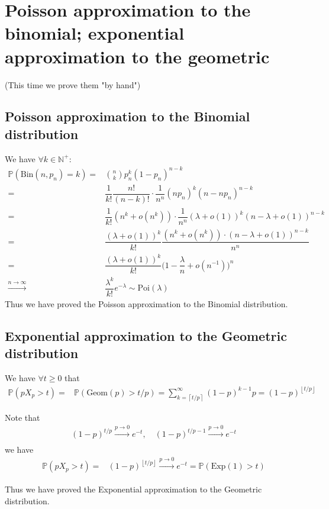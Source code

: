 \documentclass[11pt,a4paper]{article}
\numberwithin{equation}{section}%
\begin{document}
    

\section{Poisson approximation to the binomial; exponential approximation to the geometric}
(This time we prove them "by hand")

\subsection{Poisson approximation to the Binomial distribution}

We have $ \forall k\in \mathbb{N}^+: $
\begin{align*}
    \mathbb{P}\left( \mathrm{ Bin }(n,p_n) = k \right) =&  \binom{n}{k} p_n^k (1-p_n)^{n-k} \\
    =&  \dfrac{ 1 }{ k! }\dfrac{ n! }{ (n-k)! }\cdot \dfrac{ 1 }{ n^n } (np_n)^k (n-np_n)^{n-k} \\
    =& \dfrac{ 1 }{ k! }(n^k + o(n^k))\cdot \dfrac{ 1 }{ n^n } (\lambda +o(1))^k (n-\lambda +o(1))^{n-k} \\
    =& \dfrac{ (\lambda +o(1))^k }{ k! }\dfrac{ (n^k + o(n^k))\cdot(n-\lambda +o(1))^{n-k}  }{ n^n } \\
    =&\dfrac{ (\lambda +o(1))^k }{ k! }\big(1 - \dfrac{ \lambda  }{ n } + o(n^{-1}) \big)^n\\
    \xrightarrow[]{n\to\infty} & \dfrac{ \lambda^k }{ k! }e^{-\lambda }\sim \mathrm{ Poi }(\lambda ) 
\end{align*}
Thus we have proved the Poisson approximation to the Binomial distribution.


\subsection{Exponential approximation to the Geometric distribution}
We have $ \forall t \geq 0$ that 
\begin{align*}
    \mathbb{P}\left( pX_p > t \right) =& \mathbb{P}\left( \mathrm{ Geom }(p)  > t/p \right)= \sum_{k= \left\lceil t/p\right\rceil } ^\infty (1-p)^{k-1}p=(1-p)^{\left\lfloor t/p \right\rfloor } 
\end{align*}

Note that
\begin{align*}
    (1-p)^{t/p} \xrightarrow[]{p\to 0} e^{-t},\quad (1-p)^{t/p-1} \xrightarrow[]{p\to 0} e^{-t}
\end{align*}
we have
\begin{align*}
    \mathbb{P}\left( pX_p > t \right) =&(1-p)^{\left\lfloor t/p \right\rfloor } \xrightarrow[]{p\to 0} e^{-t} = \mathbb{P}\left( \mathrm{ Exp }(1) > t \right)
\end{align*}

Thus we have proved the Exponential approximation to the Geometric distribution.
\end{document}

